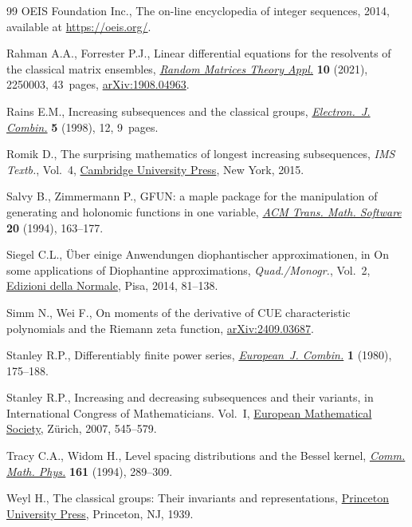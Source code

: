 \documentclass[pdftex]{sigma}
\numberwithin{equation}{section}
\theoremstyle{definition}
\begin{document}
\begin{thebibliography}{99}
{OEIS Foundation Inc.}, The on-line encyclopedia of integer sequences, 2014,
 available at \url{https://oeis.org/}.

Rahman A.A., Forrester P.J., Linear differential equations for the resolvents
 of the classical matrix ensembles,
 \href{https://doi.org/10.1142/S2010326322500034}{\textit{Random Matrices
 Theory Appl.}} \textbf{10} (2021), 2250003, 43~pages,
 \href{http://arxiv.org/abs/1908.04963}{arXiv:1908.04963}.

Rains E.M., Increasing subsequences and the classical groups,
 \href{https://doi.org/10.37236/1350}{\textit{Electron.~J. Combin.}}
 \textbf{5} (1998), 12, 9~pages.

Romik D., The surprising mathematics of longest increasing subsequences,
 \textit{IMS Textb.}, Vol.~4,
 \href{https://doi.org/10.1017/CBO9781139872003}{Cambridge University Press},
 New York, 2015.

Salvy B., Zimmermann P., {GFUN}: a maple package for the manipulation of
 generating and holonomic functions in one variable,
 \href{https://doi.org/10.1145/178365.178368}{\textit{ACM Trans. Math.
 Software}} \textbf{20} (1994), 163--177.

Siegel C.L., {\"{U}}ber einige Anwendungen diophantischer approximationen, in
 On some applications of {D}iophantine approximations, \textit{Quad./Monogr.},
 Vol.~2, \href{https://doi.org/10.1007/978-88-7642-520-2_2}{Edizioni della
 Normale}, Pisa, 2014, 81--138.

Simm N., Wei F., On moments of the derivative of {CUE} characteristic
 polynomials and the {R}iemann zeta function,
 \href{http://arxiv.org/abs/2409.03687}{arXiv:2409.03687}.

Stanley R.P., Differentiably finite power series,
 \href{https://doi.org/10.1016/S0195-6698(80)80051-5}{\textit{European~J.
 Combin.}} \textbf{1} (1980), 175--188.

Stanley R.P., Increasing and decreasing subsequences and their variants, in
 International {C}ongress of {M}athematicians. {V}ol.~{I},
 \href{https://doi.org/10.4171/022-1/21}{European Mathematical Society},
 Z\"urich, 2007, 545--579.

Tracy C.A., Widom H., Level spacing distributions and the {B}essel kernel,
 \href{https://doi.org/10.1007/BF02099779}{\textit{Comm. Math. Phys.}}
 \textbf{161} (1994), 289--309.

Weyl H., The classical groups: {T}heir invariants and representations,
 \href{https://doi.org/10.2307/j.ctv3hh48t}{Princeton University Press},
 Princeton, NJ, 1939.


\end{thebibliography}
\end{document}
